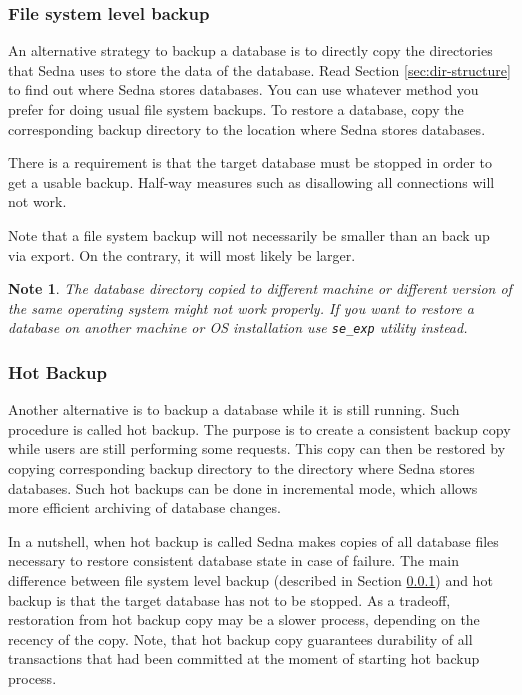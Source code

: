\documentclass[a4paper,12pt]{article}
\newtheorem{note}{Note}
\begin{document}
\subsubsection{File system level backup}
\label{sec:file-system-level-backup}
An alternative strategy to backup a database is to directly copy the directories that Sedna
uses to store the data of the database. Read Section \ref{sec:dir-structure} to find out where
Sedna stores databases. You can use whatever method you prefer for doing usual file system backups.
To restore a database, copy the corresponding backup directory to the location where Sedna stores
databases.

There is a requirement is that the target database must be stopped in order to get a usable backup.
Half-way measures such as disallowing all connections will not work.

Note that a file system backup will not necessarily be smaller than an back up via export. On
the contrary, it will most likely be larger.

\begin{note}
The database directory copied to different machine or different version of the same operating system
might not work properly. If you want to restore a database on another machine or OS installation use
\verb!se_exp! utility instead.
\end{note}


\subsubsection{Hot Backup}

Another alternative is to backup a database while it is still running. Such procedure is called hot backup.
The purpose is to create a consistent backup copy while users are still performing some requests. This copy can then be
restored by copying corresponding backup directory to the directory where Sedna stores databases. Such hot backups
can be done in incremental mode, which allows more efficient archiving of database changes.

In a nutshell, when hot backup is called Sedna makes copies of all database files necessary to restore consistent
database state in case of failure. The main difference between file system level backup (described in Section \ref{sec:file-system-level-backup}) and
hot backup is that the target database has not to be stopped. As a tradeoff, restoration from hot backup copy may
be a slower process, depending on the recency of the copy. Note, that hot backup copy guarantees durability of all
transactions that had been committed at the moment of starting hot backup process.
\end{document}
